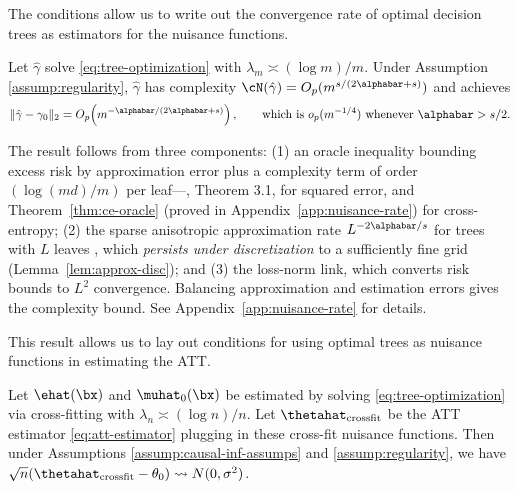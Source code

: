 \documentclass[12pt]{article}
\begin{document}
The conditions allow us to write out the convergence rate of optimal decision trees as estimators for the nuisance functions.
\begin{proposition}
\label{prop:tree-rate}
Let $\hat{\gamma}$ solve \eqref{eq:tree-optimization} with $\lambda_m \asymp (\log m)/m$. Under Assumption \ref{assump:regularity}, $\hat{\gamma}$ has complexity $\cN(\hat{\gamma}) = O_p(m^{s/(2\alphabar+s)})$ and achieves
\[
\|\hat{\gamma} - \gamma_0\|_2 = O_p\!\left(m^{-\alphabar/(2\alphabar+s)}\right), \qquad \text{which is } o_p(m^{-1/4}) \text{ whenever } \alphabar > s/2.
\]
\end{proposition}
The result follows from three components: (1) an oracle inequality bounding excess risk by approximation error plus a complexity term of order $(\log(md)/m)$ per leaf---\citet{xuStatisticalOptimalityOptimal2026}, Theorem 3.1, for squared error, and Theorem~\ref{thm:ce-oracle} (proved in Appendix~\ref{app:nuisance-rate}) for cross-entropy; (2) the sparse anisotropic approximation rate $L^{-2\alphabar/s}$ for trees with $L$ leaves \citep[Theorem~6.1]{xuStatisticalOptimalityOptimal2026}, which \emph{persists under discretization} to a sufficiently fine grid (Lemma~\ref{lem:approx-disc}); and (3) the loss-norm link, which converts risk bounds to $L^2$ convergence. Balancing approximation and estimation errors gives the complexity bound. See Appendix~\ref{app:nuisance-rate} for details.

This result allows us to lay out conditions for using optimal trees as nuisance functions in estimating the ATT. 
\begin{proposition}
Let $\ehat(\bx)$ and $\muhat_0(\bx)$ be estimated by solving \eqref{eq:tree-optimization} via cross-fitting with $\lambda_n \asymp (\log n)/n$. Let $\thetahat_{\text{crossfit}}$ be the ATT estimator \eqref{eq:att-estimator} plugging in these cross-fit nuisance functions. Then under Assumptions \ref{assump:causal-inf-assumps} and \ref{assump:regularity}, we have
$\sqrt{n}(\thetahat_{\text{crossfit}} - \theta_0) \leadsto N(0, \sigma^2)$.
\end{proposition}
\end{document}
